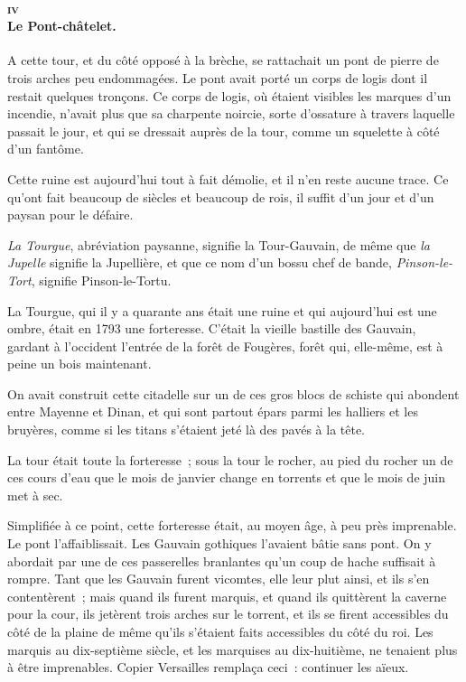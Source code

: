 \documentclass[french,twoside]{book} %
\begin{document}
\paragraph[{iv Le Pont-châtelet.}]{\textsc{iv} \\
Le Pont-châtelet.}
\label{p3l2c9p4}
\noindent A cette tour, et du côté opposé à la brèche, se rattachait un pont de pierre de trois arches peu endommagées. Le pont avait porté un corps de logis dont il restait quelques tronçons. Ce corps de logis, où étaient visibles les marques d’un incendie, n’avait plus que sa charpente noircie, sorte d’ossature à travers laquelle passait le jour, et qui se dressait auprès de la tour, comme un squelette à côté d’un fantôme.\par
Cette ruine est aujourd’hui tout à fait démolie, et il n’en reste aucune trace. Ce qu’ont fait beaucoup de siècles et beaucoup de rois, il suffit d’un jour et d’un paysan pour le défaire.\par
\emph{La Tourgue}, abréviation paysanne, signifie la Tour-Gauvain, de même que \emph{la Jupelle} signifie la Jupellière,  et que ce nom d’un bossu chef de bande, \emph{Pinson-le-Tort}, signifie Pinson-le-Tortu.\par
La Tourgue, qui il y a quarante ans était une ruine et qui aujourd’hui est une ombre, était en 1793 une forteresse. C’était la vieille bastille des Gauvain, gardant à l’occident l’entrée de la forêt de Fougères, forêt qui, elle-même, est à peine un bois maintenant.\par
On avait construit cette citadelle sur un de ces gros blocs de schiste qui abondent entre Mayenne et Dinan, et qui sont partout épars parmi les halliers et les bruyères, comme si les titans s’étaient jeté là des pavés à la tête.\par
La tour était toute la forteresse ; sous la tour le rocher, au pied du rocher un de ces cours d’eau que le mois de janvier change en torrents et que le mois de juin met à sec.\par
Simplifiée à ce point, cette forteresse était, au moyen âge, à peu près imprenable. Le pont l’affaiblissait. Les Gauvain gothiques l’avaient bâtie sans pont. On y abordait par une de ces passerelles branlantes qu’un coup de hache suffisait à rompre. Tant que les Gauvain furent vicomtes, elle leur plut ainsi, et ils s’en contentèrent ; mais quand ils furent marquis, et quand ils quittèrent la caverne pour la cour, ils jetèrent trois arches sur le torrent, et ils se firent accessibles du côté de la plaine de même qu’ils s’étaient faits accessibles du côté du roi. Les marquis au dix-septième siècle, et les marquises au dix-huitième, ne tenaient plus à être imprenables. Copier Versailles remplaça ceci : continuer les aïeux.\par
\end{document}
